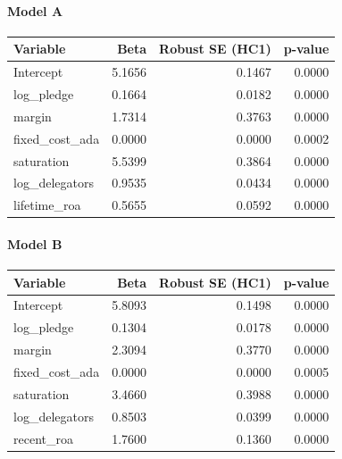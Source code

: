 \paragraph{Model A}
\begin{table}[h]
\centering
\small
\begin{tabular}{lrrr}
\toprule
Variable & Beta & Robust SE (HC1) & p-value \\
\midrule
Intercept & 5.1656 & 0.1467 & 0.0000 \\
log\_pledge & 0.1664 & 0.0182 & 0.0000 \\
margin & 1.7314 & 0.3763 & 0.0000 \\
fixed\_cost\_ada & 0.0000 & 0.0000 & 0.0002 \\
saturation & 5.5399 & 0.3864 & 0.0000 \\
log\_delegators & 0.9535 & 0.0434 & 0.0000 \\
lifetime\_roa & 0.5655 & 0.0592 & 0.0000 \\
\bottomrule
\end{tabular}
\end{table}

\paragraph{Model B}
\begin{table}[h]
\centering
\small
\begin{tabular}{lrrr}
\toprule
Variable & Beta & Robust SE (HC1) & p-value \\
\midrule
Intercept & 5.8093 & 0.1498 & 0.0000 \\
log\_pledge & 0.1304 & 0.0178 & 0.0000 \\
margin & 2.3094 & 0.3770 & 0.0000 \\
fixed\_cost\_ada & 0.0000 & 0.0000 & 0.0005 \\
saturation & 3.4660 & 0.3988 & 0.0000 \\
log\_delegators & 0.8503 & 0.0399 & 0.0000 \\
recent\_roa & 1.7600 & 0.1360 & 0.0000 \\
\bottomrule
\end{tabular}
\end{table}

